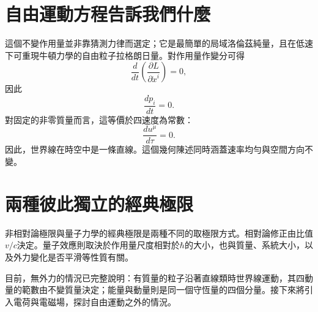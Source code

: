 \section{自由運動方程告訴我們什麼}

這個不變作用量並非靠猜測力律而選定；它是最簡單的局域洛倫茲純量，且在低速下可重現牛頓力學的自由粒子拉格朗日量。對作用量作變分可得
\begin{equation}
\frac{d}{dt}\left(\frac{\partial L}{\partial\dot x^i}\right)=0,
\end{equation}
因此
\begin{equation}
\frac{dp_i}{dt}=0.
\end{equation}
對固定的非零質量而言，這等價於四速度為常數：
\begin{equation}
\frac{du^\mu}{d\tau}=0.
\end{equation}
因此，世界線在時空中是一條直線。這個幾何陳述同時涵蓋速率均勻與空間方向不變。

\begin{classroomqa}
\end{classroomqa}

\section{兩種彼此獨立的經典極限}

非相對論極限與量子力學的經典極限是兩種不同的取極限方式。相對論修正由比值\(v/c\)決定。量子效應則取決於作用量尺度相對於\(\hbar\)的大小，也與質量、系統大小，以及外力變化是否平滑等性質有關。

\begin{classroomqa}
\end{classroomqa}

\begin{classroomqa}
\end{classroomqa}

目前，無外力的情況已完整說明：有質量的粒子沿著直線類時世界線運動，其四動量的範數由不變質量決定；能量與動量則是同一個守恆量的四個分量。接下來將引入電荷與電磁場，探討自由運動之外的情況。
